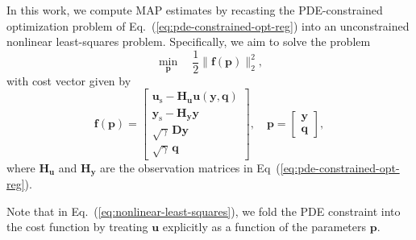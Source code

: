 \documentclass{agujournal2019}
\begin{document}
In this work, we compute MAP estimates by recasting the PDE-constrained optimization problem of Eq.~(\ref{eq:pde-constrained-opt-reg}) into an unconstrained nonlinear least-squares problem. 
Specifically, we aim to solve the problem
%
\begin{equation}
  \label{eq:nonlinear-least-squares}
  \min_{\mathbf{p}} \quad \frac{1}{2} \| \mathbf{f}(\mathbf{p}) \|^2_2,
\end{equation}
%
with cost vector given by
%
\begin{equation}
  \label{eq:nonlinear-least-squares-vector}
  \mathbf{f}(\mathbf{p}) =
  \begin{bmatrix}
    \mathbf{u}_{\mathrm{s}} - \mathbf{H}_{\mathbf{u}} \mathbf{u}(\mathbf{y}, \mathbf{q})\\
    \mathbf{y}_{\mathrm{s}} - \mathbf{H}_{\mathbf{y}} \mathbf{y}\\
    \sqrt{\gamma} \, \mathbf{D} \mathbf{y}\\
    \sqrt{\gamma} \, \mathbf{q}
  \end{bmatrix}, \quad
  \mathbf{p} =
  \begin{bmatrix}
    \mathbf{y}\\
    \mathbf{q}
  \end{bmatrix},
\end{equation}
where $\mathbf{H}_{\mathbf{u}}$ and $\mathbf{H}_{\mathbf{y}}$ are the observation matrices in Eq~(\ref{eq:pde-constrained-opt-reg}).

%

Note that in Eq.~(\ref{eq:nonlinear-least-squares}), we fold the PDE constraint into the cost function by treating $\mathbf{u}$ explicitly as a function of the parameters $\mathbf{p}$.
\end{document}
